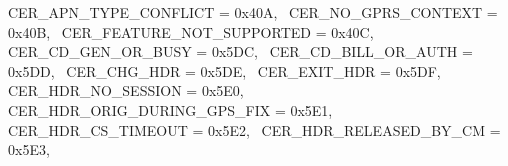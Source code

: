 \begin{DoxyItemize}
 C\+E\+R\+\_\+\+A\+P\+N\+\_\+\+T\+Y\+P\+E\+\_\+\+C\+O\+N\+F\+L\+I\+CT = 0x40A,~\newline
 C\+E\+R\+\_\+\+N\+O\+\_\+\+G\+P\+R\+S\+\_\+\+C\+O\+N\+T\+E\+XT = 0x40B,~\newline
 C\+E\+R\+\_\+\+F\+E\+A\+T\+U\+R\+E\+\_\+\+N\+O\+T\+\_\+\+S\+U\+P\+P\+O\+R\+T\+ED = 0x40C,~\newline
 C\+E\+R\+\_\+\+C\+D\+\_\+\+G\+E\+N\+\_\+\+O\+R\+\_\+\+B\+U\+SY = 0x5\+DC,~\newline
 C\+E\+R\+\_\+\+C\+D\+\_\+\+B\+I\+L\+L\+\_\+\+O\+R\+\_\+\+A\+U\+TH = 0x5\+DD,~\newline
 C\+E\+R\+\_\+\+C\+H\+G\+\_\+\+H\+DR = 0x5\+DE,~\newline
 C\+E\+R\+\_\+\+E\+X\+I\+T\+\_\+\+H\+DR = 0x5\+DF,~\newline
 C\+E\+R\+\_\+\+H\+D\+R\+\_\+\+N\+O\+\_\+\+S\+E\+S\+S\+I\+ON = 0x5\+E0,~\newline
 C\+E\+R\+\_\+\+H\+D\+R\+\_\+\+O\+R\+I\+G\+\_\+\+D\+U\+R\+I\+N\+G\+\_\+\+G\+P\+S\+\_\+\+F\+IX = 0x5\+E1,~\newline
 C\+E\+R\+\_\+\+H\+D\+R\+\_\+\+C\+S\+\_\+\+T\+I\+M\+E\+O\+UT = 0x5\+E2,~\newline
 C\+E\+R\+\_\+\+H\+D\+R\+\_\+\+R\+E\+L\+E\+A\+S\+E\+D\+\_\+\+B\+Y\+\_\+\+CM = 0x5\+E3,~\newline

\end{DoxyItemize}

